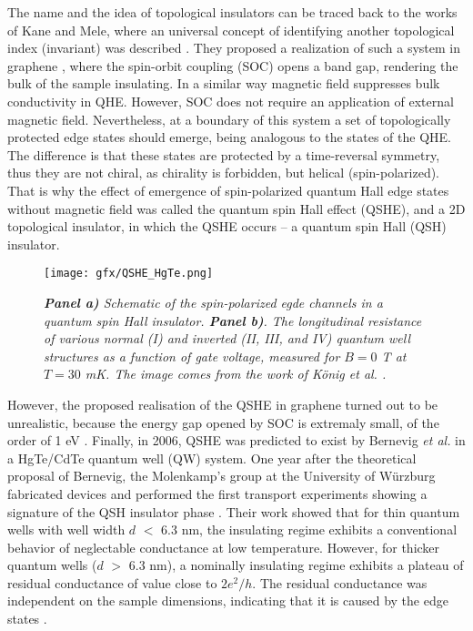 \documentclass[titlepage,a4paper]{book}
\begin{document}
The name and the idea of topological insulators can be traced back to the works of Kane and Mele, where an universal concept of identifying another topological index (invariant) was described \cite{Kane_Topology2}. They proposed a realization of such a system in graphene \cite{Kane_Topology}, where the spin-orbit coupling (SOC) opens a band gap, rendering the bulk of the sample insulating. In a similar way magnetic field suppresses bulk conductivity in QHE. However, SOC does not require an application of external magnetic field. Nevertheless, at a boundary of this system a set of topologically protected edge states should emerge, being analogous to the states of the QHE. The difference is that these states are protected by a time-reversal symmetry, thus they are not chiral, as chirality is forbidden, but helical (spin-polarized). That is why the effect of emergence of spin-polarized quantum Hall edge states without magnetic field was called the quantum spin Hall effect (QSHE), and a 2D topological insulator, in which the QSHE occurs -- a quantum spin Hall (QSH) insulator.

\begin{figure}[ht]
	\centering
	\texttt{[image: gfx/QSHE\_HgTe.png]}
	\vspace{-10pt}
	\caption{\textit{\textbf{Panel a)} Schematic of the spin-polarized egde channels in a quantum spin Hall insulator. \textbf{Panel b)}. The longitudinal resistance of various normal (I) and inverted (II, III, and IV) quantum well structures as a function of gate voltage, measured for $B = 0$ T at $T = 30$ mK. The image comes from the work of König \textit{et al.} \cite{Konig_Topology}.}}
	\label{fig:QSHE_HgTe}
\end{figure} 

However, the proposed realisation of the QSHE in graphene turned out to be unrealistic, because the energy gap opened by SOC is extremaly small, of the order of 1 \textmu eV \cite{Yao_Topology}\cite{Min_Topology}. Finally, in 2006, QSHE was predicted to exist by Bernevig \textit{et al.} \cite{Bernevig_Topology2}\cite{Bernevig_Topology1} in a HgTe/CdTe quantum well (QW) system. One year after the theoretical proposal of Bernevig, the Molenkamp's group at the University of Würzburg fabricated devices and performed the first transport experiments showing a signature of the QSH insulator phase \cite{Konig_Topology}. Their work showed that for thin quantum wells with well width $d$ $<$ 6.3 nm, the insulating regime exhibits a conventional behavior of neglectable conductance at low temperature. However, for thicker quantum wells ($d$ $>$ 6.3 nm), a nominally insulating regime exhibits a plateau of residual conductance of value close to $2e^2/h$. The residual conductance was independent on the sample dimensions, indicating that it is caused by the edge states \cite{Konig_Topology}. 
\end{document}
